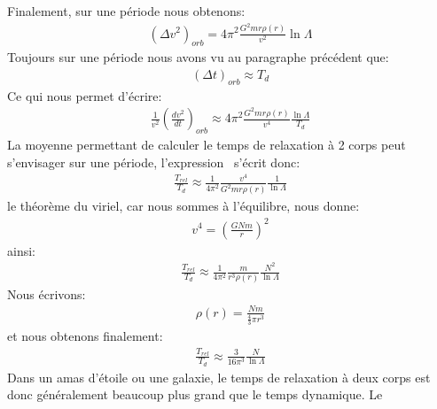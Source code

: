 Finalement, sur une période nous obtenons:
\begin{align*}
	\left(\Delta v^{2}\right)_{orb}=4\pi^{2}\frac{G^{2}mr\rho\left(r\right)}{v^{2}}\ln \Lambda
\end{align*}
Toujours sur une période nous avons vu au paragraphe précédent que:
\begin{align*}
	\left(  \Delta t\right)  _{orb}\approx T_{d}%
\end{align*}
Ce qui nous permet d'écrire:
\begin{align*}
	\frac{1}{v^{2}}\left(\frac{dv^{2}}{dt}\right)_{orb}\approx4\pi^{2}\frac{G^{2}mr\rho\left(r\right)}{v^{4}}\frac{\ln \Lambda}{T_{d}}%
\end{align*}
La moyenne permettant de calculer le temps de relaxation à 2 corps peut s'envisager sur une période, l'expression~ s'écrit donc:
\begin{align*}
	\frac{T_{rel}}{T_{d}}\approx\frac{1}{4\pi^{2}}\frac{v^{4}}{G^{2}mr\rho\left(  r\right)  }\frac{1}{\ln \Lambda}%
\end{align*}
le théorème du viriel, car nous sommes à l'équilibre, nous donne:
\begin{align*}
	v^{4}=\left(\frac{GNm}{r}\right)^{2}%
\end{align*}
ainsi:
\begin{align*}
	\frac{T_{rel}}{T_{d}}\approx\frac{1}{4\pi^{2}}\frac{m}{r^{3}\rho\left(r\right)}\frac{N^{2}}{\ln \Lambda}
\end{align*}
Nous écrivons:
\begin{align*}
	\rho\left(r\right)=\frac{Nm}{\frac{4}{3}\pi r^{3}}%
\end{align*}
et nous obtenons finalement:
\begin{align*}
	\frac{T_{rel}}{T_{d}}\approx\frac{3}{16\pi^{3}}\frac{N}{\ln \Lambda}%
\end{align*}
Dans un amas d'étoile ou une galaxie, le temps de relaxation à deux corps est donc généralement beaucoup plus grand que le temps dynamique. Le
